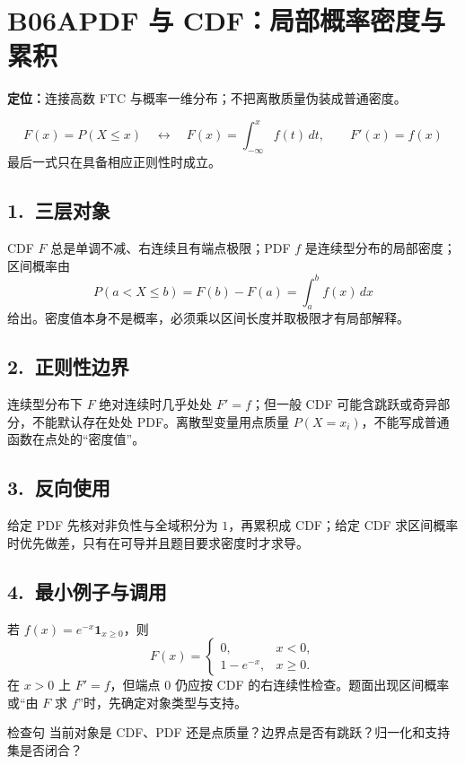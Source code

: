\documentclass[UTF8,a4paper,10pt]{ctexart}
\begin{document}
\section*{B06A\quad PDF 与 CDF：局部概率密度与累积}
\textbf{定位：}连接高数 FTC 与概率一维分布；不把离散质量伪装成普通密度。
\begin{tcolorbox}[title=母接口]
\[
F(x)=P(X\le x)\quad\longleftrightarrow\quad
F(x)=\int_{-\infty}^{x}f(t)\,dt,\qquad F'(x)=f(x)
\]
最后一式只在具备相应正则性时成立。
\end{tcolorbox}
\subsection*{1.\ 三层对象}
CDF $F$ 总是单调不减、右连续且有端点极限；PDF $f$ 是连续型分布的局部密度；区间概率由
\[
P(a<X\le b)=F(b)-F(a)=\int_a^b f(x)\,dx
\]
给出。密度值本身不是概率，必须乘以区间长度并取极限才有局部解释。
\subsection*{2.\ 正则性边界}
连续型分布下 $F$ 绝对连续时几乎处处 $F'=f$；但一般 CDF 可能含跳跃或奇异部分，不能默认存在处处 PDF。离散型变量用点质量 $P(X=x_i)$，不能写成普通函数在点处的“密度值”。
\subsection*{3.\ 反向使用}
给定 PDF 先核对非负性与全域积分为 $1$，再累积成 CDF；给定 CDF 求区间概率时优先做差，只有在可导并且题目要求密度时才求导。
\subsection*{4.\ 最小例子与调用}
若 $f(x)=e^{-x}\mathbf1_{x\ge0}$，则
\[
F(x)=\begin{cases}0,&x<0,\\1-e^{-x},&x\ge0.\end{cases}
\]
在 $x>0$ 上 $F'=f$，但端点 $0$ 仍应按 CDF 的右连续性检查。题面出现区间概率或“由 $F$ 求 $f$”时，先确定对象类型与支持。
\begin{corebox}{检查句}
当前对象是 CDF、PDF 还是点质量？边界点是否有跳跃？归一化和支持集是否闭合？
\end{corebox}
\end{document}
